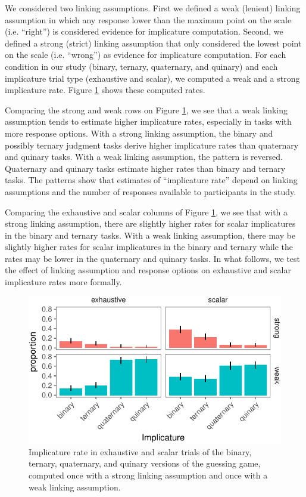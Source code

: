 \documentclass[floatsintext,man]{apa6}
\theoremstyle{definition}
\theoremstyle{definition}
\theoremstyle{definition}
\theoremstyle{remark}
\begin{document}
We considered two linking assumptions. First we defined a weak (lenient)
linking assumption in which any response lower than the maximum point on
the scale (i.e. \enquote{right}) is considered evidence for implicature
computation. Second, we defined a strong (strict) linking assumption
that only considered the lowest point on the scale (i.e.
\enquote{wrong}) as evidence for implicature computation. For each
condition in our study (binary, ternary, quaternary, and quinary) and
each implicature trial type (exhaustive and scalar), we computed a weak
and a strong implicature rate. Figure \ref{fig:implicatureRatePlot}
shows these computed rates.

Comparing the strong and weak rows on Figure
\ref{fig:implicatureRatePlot}, we see that a weak linking assumption
tends to estimate higher implicature rates, especially in tasks with
more response options. With a strong linking assumption, the binary and
possibly ternary judgment tasks derive higher implicature rates than
quaternary and quinary tasks. With a weak linking assumption, the
pattern is reversed. Quaternary and quinary tasks estimate higher rates
than binary and ternary tasks. The patterns show that estimates of
\enquote{implicature rate} depend on linking assumptions and the number
of responses available to participants in the study.

Comparing the exhaustive and scalar columns of Figure
\ref{fig:implicatureRatePlot}, we see that with a strong linking
assumption, there are slightly higher rates for scalar implicatures in
the binary and ternary tasks. With a weak linking assumption, there may
be slightly higher rates for scalar implicatures in the binary and
ternary while the rates may be lower in the quaternary and quinary
tasks. In what follows, we test the effect of linking assumption and
response options on exhaustive and scalar implicature rates more
formally.

\begin{figure}
\centering
\includegraphics{writeup_files/figure-latex/implicatureRatePlot-1.pdf}
\caption{\label{fig:implicatureRatePlot}Implicature rate in exhaustive and
scalar trials of the binary, ternary, quaternary, and quinary versions
of the guessing game, computed once with a strong linking assumption and
once with a weak linking assumption.}
\end{figure}
\end{document}
